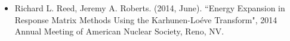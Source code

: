 \documentclass[margin, 10pt]{res} %
\begin{document}
\begin{resume}
\begin{itemize}
\item Richard L. Reed, Jeremy A. Roberts. (2014, June). ``Energy Expansion in Response Matrix Methods Using the Karhunen-Lo\'{e}ve Transform", 2014 Annual Meeting of American Nuclear Society, Reno, NV.
\end{itemize}



\end{resume}
\end{document}

